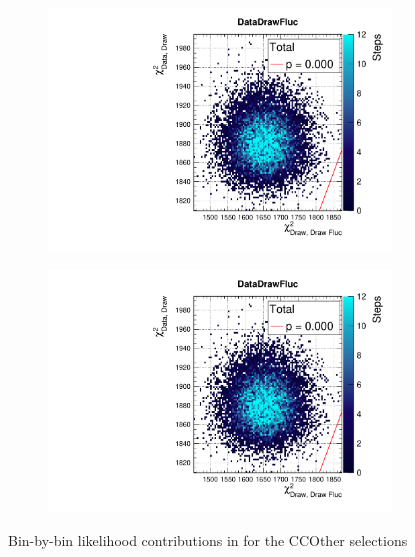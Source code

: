 \begin{figure}[h]
	\begin{subfigure}[t]{0.49\textwidth}
		\includegraphics[width=\textwidth, trim={0mm 6mm 0mm 11mm}, clip,page=16]{figures/mach3/data/postpred/2017b_NewData_NewDet_UpdXsecStep_2Xsec_4Det_5Flux_0_PostPred_procs}
	\end{subfigure}
\begin{subfigure}[t]{0.49\textwidth}
	\includegraphics[width=\textwidth, trim={0mm 6mm 0mm 11mm}, clip,page=52]{figures/mach3/data/postpred/2017b_NewData_NewDet_UpdXsecStep_2Xsec_4Det_5Flux_0_PostPred_procs}
\end{subfigure}
	\caption{Bin-by-bin likelihood contributions in \pmu \cosmu for the CCOther selections}
	\label{fig:posterior_pred_data_fgd1ccother}
\end{figure}

